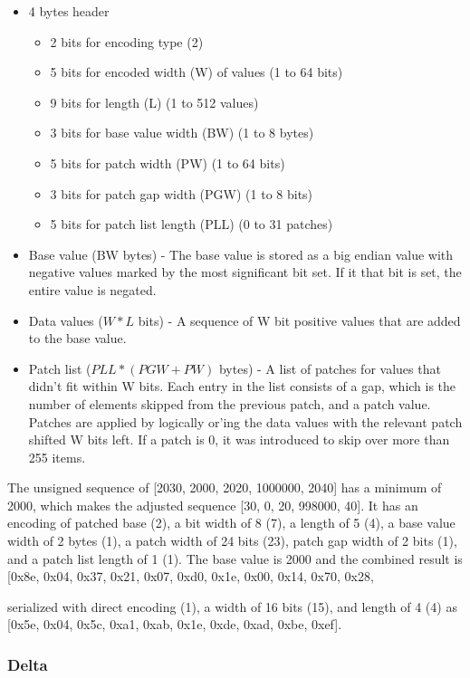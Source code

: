 \documentclass{article}
\begin{document}
\begin{itemize}
\item 4 bytes header
  \begin{itemize}
  \item 2 bits for encoding type (2)
  \item 5 bits for encoded width (W) of values (1 to 64 bits)
  \item 9 bits for length (L) (1 to 512 values)
  \item 3 bits for base value width (BW) (1 to 8 bytes)
  \item 5 bits for patch width (PW) (1 to 64 bits)
  \item 3 bits for patch gap width (PGW) (1 to 8 bits)
  \item 5 bits for patch list length (PLL) (0 to 31 patches)
  \end{itemize}
\item Base value (BW bytes) - The base value is stored as a big endian value 
  with negative values marked by the most significant bit set. If it that
  bit is set, the entire value is negated.
\item Data values ($W * L$ bits) - A sequence of W bit positive values that
  are added to the base value.
\item Patch list ($PLL * (PGW + PW)$ bytes) - A list of patches for values
  that didn't fit within W bits. Each entry in the list consists of a gap,
  which is the number of elements skipped from the previous patch, and a patch
  value. Patches are applied by logically or'ing the data values with
  the relevant patch shifted W bits left. If a patch is 0, it was introduced
  to skip over more than 255 items.
\end{itemize}

The unsigned sequence of [2030, 2000, 2020, 1000000, 2040] has a
minimum of 2000, which makes the adjusted sequence [30, 0, 20, 998000,
  40]. It has an encoding of patched base (2), a bit width of 8 (7), a
length of 5 (4), a base value width of 2 bytes (1), a patch width of
24 bits (23), patch gap width of 2 bits (1), and a patch list length
of 1 (1). The base value is 2000 and the combined result is [0x8e,
  0x04, 0x37, 0x21, 0x07, 0xd0, 0x1e, 0x00, 0x14, 0x70, 0x28,


serialized with direct encoding (1), a width of 16 bits (15), and
length of 4 (4) as [0x5e, 0x04, 0x5c, 0xa1, 0xab, 0x1e, 0xde, 0xad,
  0xbe, 0xef].

\subsubsection{Delta}
\end{document}
